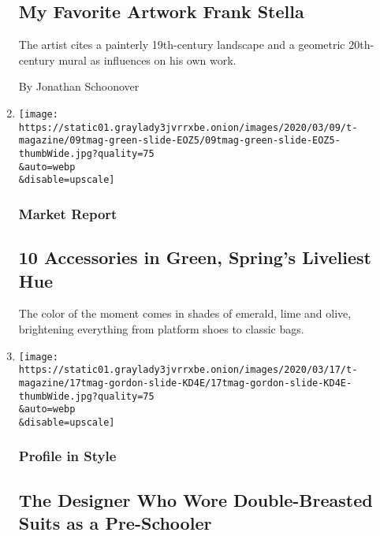 \begin{enumerate}
  \hypertarget{my-favorite-artwork--frank-stella}{%
  \subsection{My Favorite Artwork \textbar{} Frank
  Stella}\label{my-favorite-artwork--frank-stella}}

  The artist cites a painterly 19th-century landscape and a geometric
  20th-century mural as influences on his own work.

  By Jonathan Schoonover
\item
  \href{/2020/03/17/t-magazine/green-accessories.html}{}

  \texttt{[image: https://static01.graylady3jvrrxbe.onion/images/2020/03/09/t-magazine/09tmag-green-slide-EOZ5/09tmag-green-slide-EOZ5-thumbWide.jpg?quality=75\\\&auto=webp\\\&disable=upscale]}

  \hypertarget{market-report}{%
  \subsubsection{Market Report}\label{market-report}}

  \hypertarget{10-accessories-in-green-springs-liveliest-hue}{%
  \subsection{10 Accessories in Green, Spring's Liveliest
  Hue}\label{10-accessories-in-green-springs-liveliest-hue}}

  The color of the moment comes in shades of emerald, lime and olive,
  brightening everything from platform shoes to classic bags.
\item
  \href{/2020/03/17/t-magazine/wes-gordon-carolina-herrera-inspiration.html}{}

  \texttt{[image: https://static01.graylady3jvrrxbe.onion/images/2020/03/17/t-magazine/17tmag-gordon-slide-KD4E/17tmag-gordon-slide-KD4E-thumbWide.jpg?quality=75\\\&auto=webp\\\&disable=upscale]}

  \hypertarget{profile-in-style}{%
  \subsubsection{Profile in Style}\label{profile-in-style}}

  \hypertarget{the-designer-who-wore-double-breasted-suits-as-a-pre-schooler}{%
  \subsection{The Designer Who Wore Double-Breasted Suits as a
  Pre-Schooler}\label{the-designer-who-wore-double-breasted-suits-as-a-pre-schooler}}


\end{enumerate}
